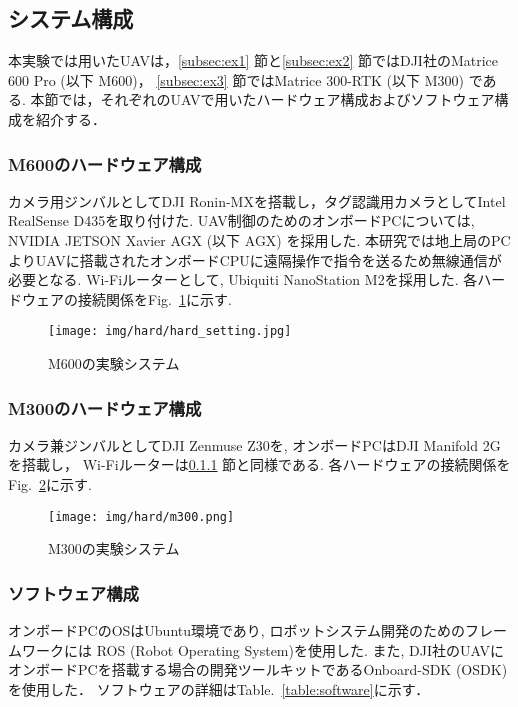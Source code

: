\documentclass[a4j,fleqn,dvipdfmx,uplatex]{jsarticle}
\newcommand{\figref}[1]{Fig.\ \ref{#1}}
\newcommand{\tableref}[1]{Table.\ \ref{#1}}
\newcommand{\subsecref}[1]{\ref{#1}\hspace{0.2zw} 節}
\begin{document}
\subsection{システム構成}\label{subsec:hard}
本実験では用いたUAVは，\subsecref{subsec:ex1}と\subsecref{subsec:ex2}ではDJI社のMatrice 600 Pro (以下 M600)，
\subsecref{subsec:ex3}ではMatrice 300-RTK (以下 M300) である.
本節では，それぞれのUAVで用いたハードウェア構成およびソフトウェア構成を紹介する．

\subsubsection{M600のハードウェア構成}\label{subsubsec:m600}
カメラ用ジンバルとしてDJI Ronin-MXを搭載し，タグ認識用カメラとしてIntel RealSense D435を取り付けた. 
UAV制御のためのオンボードPCについては, NVIDIA JETSON Xavier AGX (以下 AGX) を採用した. 
本研究では地上局のPCよりUAVに搭載されたオンボードCPUに遠隔操作で指令を送るため無線通信が必要となる. 
Wi-Fiルーターとして, Ubiquiti NanoStation M2を採用した. 各ハードウェアの接続関係を\figref{fig:m600_setting}に示す. 

\begin{figure}[tb]
    \centering
        \texttt{[image: img/hard/hard\_setting.jpg]}
        \caption{M600の実験システム}
        \label{fig:m600_setting}
\end{figure}

\subsubsection{M300のハードウェア構成} 
カメラ兼ジンバルとしてDJI Zenmuse Z30を, オンボードPCはDJI Manifold 2Gを搭載し，
Wi-Fiルーターは\subsecref{subsubsec:m600}と同様である. 
各ハードウェアの接続関係を\figref{fig:m300_setting}に示す. 

\begin{figure}[tb]
    \centering
        \texttt{[image: img/hard/m300.png]}
        \caption{M300の実験システム}
        \label{fig:m300_setting}
\end{figure}

\subsubsection{ソフトウェア構成}
オンボードPCのOSはUbuntu環境であり, ロボットシステム開発のためのフレームワークには
ROS (Robot Operating System)\cite{ROS}を使用した. また, DJI社のUAVにオンボードPCを搭載する場合の開発ツールキットであるOnboard-SDK (OSDK)\cite{OSDK} を使用した．
ソフトウェアの詳細は\tableref{table:software}に示す．
\end{document}
